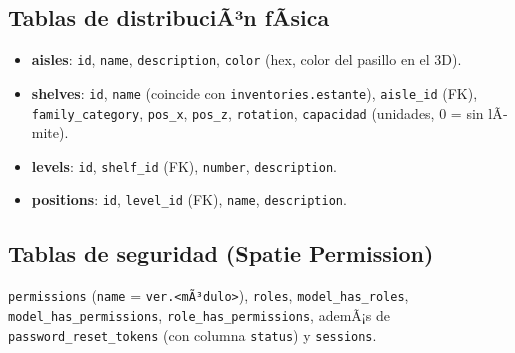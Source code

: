 ﻿\documentclass[a4paper, 12pt]{article}
\begin{document}
\subsection{Tablas de distribuciÃ³n fÃ­sica}
\begin{itemize}
    \item \textbf{aisles}: \texttt{id}, \texttt{name}, \texttt{description}, \texttt{color} (hex, color del pasillo en el 3D).
    \item \textbf{shelves}: \texttt{id}, \texttt{name} (coincide con \texttt{inventories.estante}), \texttt{aisle\_id} (FK), \texttt{family\_category}, \texttt{pos\_x}, \texttt{pos\_z}, \texttt{rotation}, \texttt{capacidad} (unidades, 0 = sin lÃ­mite).
    \item \textbf{levels}: \texttt{id}, \texttt{shelf\_id} (FK), \texttt{number}, \texttt{description}.
    \item \textbf{positions}: \texttt{id}, \texttt{level\_id} (FK), \texttt{name}, \texttt{description}.
\end{itemize}

\subsection{Tablas de seguridad (Spatie Permission)}
\texttt{permissions} (\texttt{name} = \texttt{ver.<mÃ³dulo>}), \texttt{roles}, \texttt{model\_has\_roles}, \texttt{model\_has\_permissions}, \texttt{role\_has\_permissions}, ademÃ¡s de \texttt{password\_reset\_tokens} (con columna \texttt{status}) y \texttt{sessions}.

\end{document}
